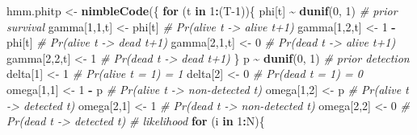 \documentclass[
  12pt,
]{krantz}
\newenvironment{Shaded}{\begin{snugshade}}{\end{snugshade}}
\newcommand{\CommentTok}[1]{\textcolor[rgb]{0.56,0.35,0.01}{\textit{#1}}}
\newcommand{\ControlFlowTok}[1]{\textcolor[rgb]{0.13,0.29,0.53}{\textbf{#1}}}
\newcommand{\DecValTok}[1]{\textcolor[rgb]{0.00,0.00,0.81}{#1}}
\newcommand{\FunctionTok}[1]{\textcolor[rgb]{0.13,0.29,0.53}{\textbf{#1}}}
\newcommand{\NormalTok}[1]{#1}
\newcommand{\OtherTok}[1]{\textcolor[rgb]{0.56,0.35,0.01}{#1}}
\newcommand{\SpecialCharTok}[1]{\textcolor[rgb]{0.81,0.36,0.00}{\textbf{#1}}}
\begin{document}
\begin{Shaded}
\begin{Highlighting}[]
\NormalTok{hmm.phitp }\OtherTok{\textless{}{-}} \FunctionTok{nimbleCode}\NormalTok{(\{}
  \ControlFlowTok{for}\NormalTok{ (t }\ControlFlowTok{in} \DecValTok{1}\SpecialCharTok{:}\NormalTok{(T}\DecValTok{{-}1}\NormalTok{))\{}
\NormalTok{    phi[t] }\SpecialCharTok{\textasciitilde{}} \FunctionTok{dunif}\NormalTok{(}\DecValTok{0}\NormalTok{, }\DecValTok{1}\NormalTok{) }\CommentTok{\# prior survival}
\NormalTok{    gamma[}\DecValTok{1}\NormalTok{,}\DecValTok{1}\NormalTok{,t] }\OtherTok{\textless{}{-}}\NormalTok{ phi[t]      }\CommentTok{\# Pr(alive t {-}\textgreater{} alive t+1)}
\NormalTok{    gamma[}\DecValTok{1}\NormalTok{,}\DecValTok{2}\NormalTok{,t] }\OtherTok{\textless{}{-}} \DecValTok{1} \SpecialCharTok{{-}}\NormalTok{ phi[t]  }\CommentTok{\# Pr(alive t {-}\textgreater{} dead t+1)}
\NormalTok{    gamma[}\DecValTok{2}\NormalTok{,}\DecValTok{1}\NormalTok{,t] }\OtherTok{\textless{}{-}} \DecValTok{0}        \CommentTok{\# Pr(dead t {-}\textgreater{} alive t+1)}
\NormalTok{    gamma[}\DecValTok{2}\NormalTok{,}\DecValTok{2}\NormalTok{,t] }\OtherTok{\textless{}{-}} \DecValTok{1}        \CommentTok{\# Pr(dead t {-}\textgreater{} dead t+1)}
\NormalTok{  \}}
\NormalTok{  p }\SpecialCharTok{\textasciitilde{}} \FunctionTok{dunif}\NormalTok{(}\DecValTok{0}\NormalTok{, }\DecValTok{1}\NormalTok{) }\CommentTok{\# prior detection}
\NormalTok{  delta[}\DecValTok{1}\NormalTok{] }\OtherTok{\textless{}{-}} \DecValTok{1}          \CommentTok{\# Pr(alive t = 1) = 1}
\NormalTok{  delta[}\DecValTok{2}\NormalTok{] }\OtherTok{\textless{}{-}} \DecValTok{0}          \CommentTok{\# Pr(dead t = 1) = 0}
\NormalTok{  omega[}\DecValTok{1}\NormalTok{,}\DecValTok{1}\NormalTok{] }\OtherTok{\textless{}{-}} \DecValTok{1} \SpecialCharTok{{-}}\NormalTok{ p    }\CommentTok{\# Pr(alive t {-}\textgreater{} non{-}detected t)}
\NormalTok{  omega[}\DecValTok{1}\NormalTok{,}\DecValTok{2}\NormalTok{] }\OtherTok{\textless{}{-}}\NormalTok{ p        }\CommentTok{\# Pr(alive t {-}\textgreater{} detected t)}
\NormalTok{  omega[}\DecValTok{2}\NormalTok{,}\DecValTok{1}\NormalTok{] }\OtherTok{\textless{}{-}} \DecValTok{1}        \CommentTok{\# Pr(dead t {-}\textgreater{} non{-}detected t)}
\NormalTok{  omega[}\DecValTok{2}\NormalTok{,}\DecValTok{2}\NormalTok{] }\OtherTok{\textless{}{-}} \DecValTok{0}        \CommentTok{\# Pr(dead t {-}\textgreater{} detected t)}
  \CommentTok{\# likelihood}
  \ControlFlowTok{for}\NormalTok{ (i }\ControlFlowTok{in} \DecValTok{1}\SpecialCharTok{:}\NormalTok{N)\{}

\end{Highlighting}
\end{Shaded}
\end{document}
